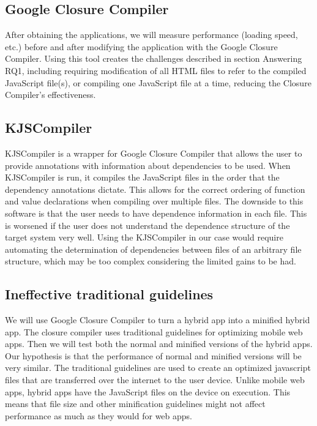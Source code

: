 \documentclass{acm_proc_article-sp}
\begin{document}
\subsection{Google Closure Compiler}
After obtaining the applications, we will measure performance (loading speed, etc.) before and after modifying the application with the Google Closure Compiler. 
Using this tool creates the challenges described in section Answering RQ1, including requiring modification of all HTML files to refer to the compiled JavaScript file(s), or compiling one JavaScript file at a time, reducing the Closure Compiler's effectiveness. 

\subsection{KJSCompiler}
KJSCompiler is a wrapper for Google Closure Compiler that allows the user to provide annotations with information about dependencies to be used.
When KJSCompiler is run, it compiles the JavaScript files in the order that the dependency annotations dictate.
This allows for the correct ordering of function and value declarations when compiling over multiple files.
The downside to this software is that the user needs to have dependence information in each file. 
This is worsened if the user does not understand the dependence structure of the target system very well. 
Using the KJSCompiler in our case would require automating the determination of dependencies between files of an arbitrary file structure, which may be too complex considering the limited gains to be had.


\subsection{Ineffective traditional guidelines}
We will use Google Closure Compiler to turn a hybrid app into a minified hybrid app.
The closure compiler uses traditional guidelines for optimizing mobile web apps.
Then we will test both the normal and minified versions of the hybrid apps.
Our hypothesis is that the performance of normal and minified versions will be very similar.
The traditional guidelines are used to create an optimized javascript files that are transferred over the internet to the user device.
Unlike mobile web apps, hybrid apps have the JavaScript files on the device on execution.
This means that file size and other minification guidelines might not affect performance as much as they would for web apps.
\end{document}
